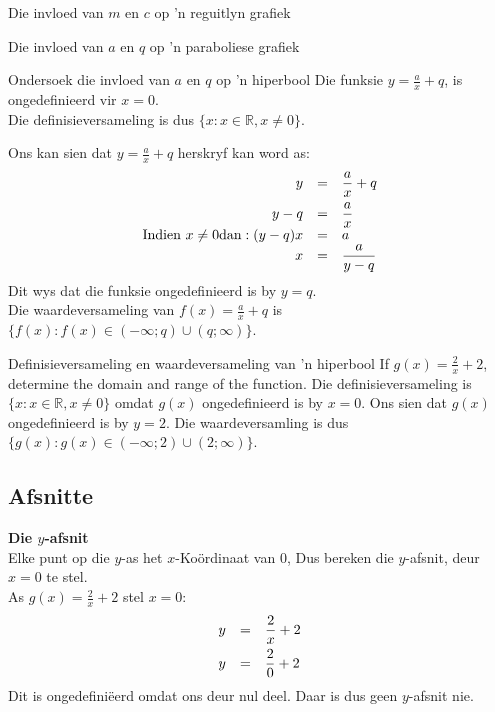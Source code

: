 \begin{Ondersoek}{Die invloed van $m$ en $c$ op 'n reguitlyn grafiek}
\begin{Ondersoek}{Die invloed van $a$ en $q$ op 'n paraboliese grafiek}
\begin{Ondersoek}{Ondersoek die invloed van $a$ en $q$ op 'n hiperbool}
Die funksie $y=\frac{a}{x}+q$, is ongedefinieerd vir $x=0$. \\
Die definisieversameling is dus $\{x:x\in \mathbb{R},x\ne 0\}$.\par 
Ons kan sien dat $y=\frac{a}{x}+q$ herskryf kan word as:
\begin{equation*}
\begin{array}{ccl}\hfill y& =& \dfrac{a}{x}+q\hfill \vspace{4pt} \\
 \hfill y-q& =& \dfrac{a}{x}\hfill \\
 \hfill \mbox{Indien }x \ne  0 \mbox{dan}:(y-q)x& =& a\hfill \\
 \hfill x& =& \dfrac{a}{y-q}\hfill 
\end{array}
\end{equation*}
Dit wys dat die funksie ongedefinieerd is by $y=q$. \\
Die waardeversameling van $f(x)=\frac{a}{x}+q$ is $\{f(x):f(x)\in (-\infty ;q)\cup (q;\infty )\}$.\par 

\begin{wex}{Definisieversameling en waardeversameling van 'n hiperbool}
{If $g(x)=\frac{2}{x}+2$, determine the domain and range of the function.}
{
Die definisieversameling is $\{x:x\in \mathbb{R},x\ne 0\}$ omdat $g(x)$ ongedefinieerd is by $x=0$.
Ons sien dat  $g(x)$ ongedefinieerd is by $y=2$.  Die waardeversamling is dus $\{g(x):g(x)\in (-\infty ;2)\cup (2;\infty )\}$.
}
\end{wex}


\subsection*{Afsnitte}

\textbf{Die $y$-afsnit} \\
Elke punt op die $y$-as het $x$-Ko\"ordinaat van $0$, Dus bereken die $y$-afsnit, deur $x=0$ te stel.\\
As $g(x)=\frac{2}{x}+2$ stel $x=0$:
\begin{equation*}
\begin{array}{ccc}\hfill y& =& \dfrac{2}{x}+2\hfill \vspace{4pt}\\
 \hfill y& =& \dfrac{2}{0}+2\hfill 
\end{array}
\end{equation*}
Dit is ongedefiniëerd omdat ons deur nul deel. Daar is dus geen $y$-afsnit nie.\\
\\


\end{Ondersoek}
\end{Ondersoek}
\end{Ondersoek}
